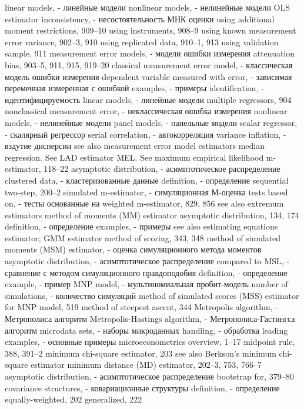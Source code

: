 linear models, - линейные модели
nonlinear models, - нелинейные модели
OLS estimator inconsistency, - несостоятельность МНК оценки
using additional moment restrictions, 909–10 
using instruments, 908–9
using known measurement error variance, 902–3, 910
using replicated data, 910–1, 913
using validation sample, 911 
measurement error models, - модели ошибки измерения
attenuation bias, 903–5, 911, 915, 919–20 
classical measurement error model, - классическая модель ошибки измерения
dependent variable measured with error, - зависимая переменная измеренная с ошибкой
examples, - примеры
identification, - идентифицируемость
linear models, - линейные модели
multiple regressors, 904
nonclassical measurement error, - неклассическая ошибка измерения
nonlinear models, - нелинейные модели
panel models, - панельные модели
scalar regressor, - скалярный регрессор
serial correlation, - автокорреляция
variance inflation, - вздутие дисперсии
see also measurement error model estimators
median regression. See LAD estimator MEL. See maximum empirical likelihood m-estimator, 118–22
asymptotic distribution, - асимптотическое распределение
clustered data, - кластеризованные данные
definition, - определение
sequential two-step, 200–2 
simulated m-estimator, - симуляционная М-оценка
tests based on, - тесты основанные на
weighted m-estimator, 829, 856 see also extremum estimators
method of moments (MM) estimator asymptotic distribution, 134, 174 
definition, - определение
examples, - примеры
see also estimating equations estimator; GMM estimator
method of scoring, 343, 348
method of simulated moments (MSM) estimator, - оценка симуляционного метода моментов
asymptotic distribution, - асимптотическое распределение
compared to MSL, - сравнение с методом симуляционного правдоподобия
definition, - определение
example, - пример
MNP model, - мультиномиальная пробит-модель
number of simulations, - количество симуляций
method of simulated scores (MSS) estimator for MNP model, 519
method of steepest ascent, 344
Metropolis algorithm, - Метрополиса алгоритм
Metropolis-Hastings algorithm, - Метрополиса-Гастингса алгоритм
microdata sets, - наборы микроданных
handling, - обработка
leading examples, - основные примеры
microeconometrics overview, 1–17 midpoint rule, 388, 391–2 minimum chi-square estimator, 203
see also Berkson’s minimum chi-square estimator minimum distance (MD) estimator, 202–3, 753, 766–7
asymptotic distribution, - асимптотическое распределение
bootstrap for, 379–80 
covariance structures, - ковариационные структуры
definition, - определение
equally-weighted, 202 generalized, 222
